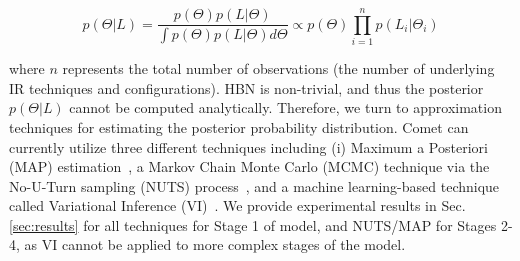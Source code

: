 \vspace{-0.3cm}
\begin{equation} \label{eq_bayes}
p(\Theta|L) = \dfrac{p(\Theta)p(L|\Theta)}{\int p(\Theta)p(L|\Theta)d\Theta} \propto p(\Theta) \prod\limits_{i=1}^n p(L_i|\Theta_i)
\end{equation}

\noindent where $n$ represents the total number of observations (\ie the number of underlying IR techniques and configurations).  \Comets HBN is non-trivial, and thus the posterior $p(\Theta|L)$ cannot be computed analytically. Therefore, we turn to approximation techniques for estimating the posterior probability distribution. Comet can currently utilize three different techniques including (i) Maximum a Posteriori (MAP) estimation~\cite{Bassett2018MaximumEstimators}, a Markov Chain Monte Carlo (MCMC) technique via the No-U-Turn sampling (NUTS) process~\cite{Hoffman2011TheCarlo}, and a machine learning-based technique called Variational Inference (VI)~\cite{Bishop:2006}. We provide experimental results in Sec. \ref{sec:results} for all techniques for Stage 1 of \Comets model, and NUTS/MAP for Stages 2-4, as VI cannot be applied to more complex stages of the model.

